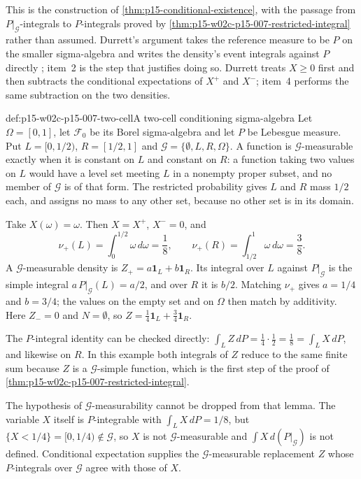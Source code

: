 This is the construction of \cref{thm:p15-conditional-existence}, with
the passage from \(P|_{\mathcal G}\)-integrals to \(P\)-integrals proved by
\cref{thm:p15-w02c-p15-007-restricted-integral} rather than assumed.
Durrett's argument takes the reference measure to be \(P\) on the smaller
sigma-algebra and writes the density's event integrals against \(P\)
directly \cite[p.~207]{DurrettPTEAuthor2019}; item~2 is the step that
justifies doing so. Durrett treats \(X\geq0\) first and then subtracts the
conditional expectations of \(X^+\) and \(X^-\); item~4 performs the same
subtraction on the two densities.

\begin{hbexample}{def:p15-w02c-p15-007-two-cell}{A two-cell conditioning sigma-algebra}
Let \(\Omega=[0,1]\), let \(\mathcal F_0\) be its Borel sigma-algebra and
let \(P\) be Lebesgue measure. Put \(L=[0,1/2)\), \(R=[1/2,1]\) and
\(\mathcal G=\{\emptyset,L,R,\Omega\}\). A function is
\(\mathcal G\)-measurable exactly when it is constant on \(L\) and constant
on \(R\): a function taking two values on \(L\) would have a level set
meeting \(L\) in a nonempty proper subset, and no member of \(\mathcal G\)
is of that form. The restricted probability gives \(L\) and \(R\) mass
\(1/2\) each, and assigns no mass to any other set, because no other set
is in its domain.

Take \(X(\omega)=\omega\). Then \(X=X^+\), \(X^-=0\), and
\[
        \nu_+(L)=\int_0^{1/2}\omega\,d\omega=\frac18,\qquad
        \nu_+(R)=\int_{1/2}^{1}\omega\,d\omega=\frac38.
\]
A \(\mathcal G\)-measurable density is \(Z_+=a\mathbf1_L+b\mathbf1_R\).
Its integral over \(L\) against \(P|_{\mathcal G}\) is the simple integral
\(a\,P|_{\mathcal G}(L)=a/2\), and over \(R\) it is \(b/2\). Matching
\(\nu_+\) gives \(a=1/4\) and \(b=3/4\); the values on the empty set and
on \(\Omega\) then match by additivity. Here \(Z_-=0\) and \(N=\emptyset\),
so \(Z=\tfrac14\mathbf1_L+\tfrac34\mathbf1_R\).

The \(P\)-integral identity can be checked directly:
\(\int_LZ\,dP=\tfrac14\cdot\tfrac12=\tfrac18=\int_LX\,dP\), and likewise
on \(R\). In this example both integrals of \(Z\) reduce to the same finite
sum because \(Z\) is a \(\mathcal G\)-simple function, which is the first
step of the proof of \cref{thm:p15-w02c-p15-007-restricted-integral}.

The hypothesis of \(\mathcal G\)-measurability cannot be dropped from that
lemma. The variable \(X\) itself is \(P\)-integrable with
\(\int_LX\,dP=1/8\), but \(\{X<1/4\}=[0,1/4)\notin\mathcal G\), so
\(X\) is not \(\mathcal G\)-measurable and \(\int X\,d(P|_{\mathcal G})\)
is not defined. Conditional expectation supplies the
\(\mathcal G\)-measurable replacement \(Z\) whose \(P\)-integrals over
\(\mathcal G\) agree with those of \(X\).
\end{hbexample}

